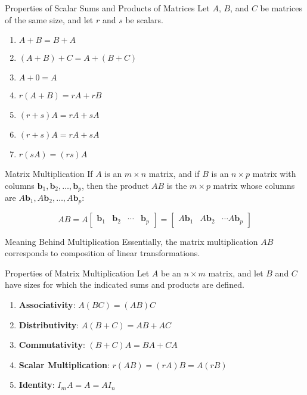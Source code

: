 \documentclass{article}
\begin{document}
\begin{theorem}{Properties of Scalar Sums and Products of Matrices}
	Let $A$, $B$, and $C$ be matrices of the same size, and let $r$ and $s$ be scalars.

	\begin{enumerate}[label=\alph*)]
		\item
		      $A + B = B + A$
		\item
		      $(A + B) + C = A + (B + C)$
		\item
		      $A + 0 = A$
		\item
		      $r(A + B) = rA + rB$
		\item
		      $(r + s)A = rA + sA$
		\item
		      $(r + s)A = rA + sA$
		\item
		      $r(sA) = (rs)A$
	\end{enumerate}
\end{theorem}

\begin{definition}{Matrix Multiplication}
	If $A$ is an $m \times n$ matrix, and if $B$ is an $n \times p$ matrix with columns $\mathbf{b}_1, \mathbf{b}_2, \ldots, \mathbf{b}_p$, then the product $AB$ is the $m \times p$ matrix whose columns are $A\mathbf{b}_1, A\mathbf{b}_2, \ldots, A\mathbf{b}_p$:

	$$
		AB = A\begin{bmatrix} \mathbf{b}_1 & \mathbf{b}_2 & \cdots & \mathbf{b}_p \end{bmatrix} = \begin{bmatrix} A\mathbf{b}_1 & A\mathbf{b}_2 & \cdots A\mathbf{b}_p \end{bmatrix}
	$$

	\begin{info}[colback=blue!10]{Meaning Behind Multiplication}
		Essentially, the matrix multiplication $AB$ corresponds to composition of linear transformations.
	\end{info}
\end{definition}

\begin{theorem}{Properties of Matrix Multiplication}
	Let $A$ be an $n \times m$ matrix, and let $B$ and $C$ have sizes for which the indicated sums and products are defined.
	\begin{enumerate}[label=\alph*)]
		\item \textbf{Associativity}:
		      $A(BC) = (AB)C$
		\item \textbf{Distributivity}:
		      $A(B + C) = AB + AC$
		\item \textbf{Commutativity}:
		      $(B + C)A = BA + CA$
		\item \textbf{Scalar Multiplication}:
		      $r(AB) = (rA)B = A(rB)$
		\item \textbf{Identity}:
		      $I_mA = A = AI_n$
	\end{enumerate}
\end{theorem}
\end{document}
